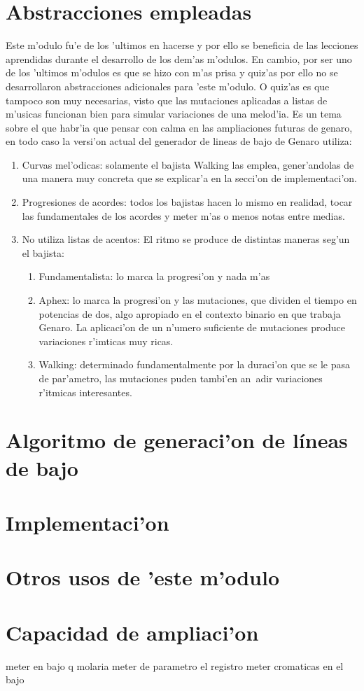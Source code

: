 \documentclass[a4paper,12pt]{article}
\begin{document}
\section{Abstracciones empleadas}
Este m'odulo fu'e de los 'ultimos en hacerse y por ello se beneficia de las lecciones aprendidas durante el desarrollo de los dem'as m'odulos. En cambio, por ser uno de los 'ultimos m'odulos es que se hizo con m'as prisa y quiz'as por ello no se desarrollaron abstracciones adicionales para 'este m'odulo. O quiz'as es que tampoco son muy necesarias, visto que las mutaciones aplicadas a listas de m'usicas funcionan bien para simular variaciones de una melod'ia. Es un tema sobre el que habr'ia que pensar con calma en las ampliaciones futuras de genaro, en todo caso la versi'on actual del generador de lineas de bajo de Genaro utiliza:
        \begin{enumerate}
        \item Curvas mel'odicas: solamente el bajista Walking las emplea, gener'andolas de una manera muy concreta que se explicar'a en la secci'on de implementaci'on.
        \item Progresiones de acordes: todos los bajistas hacen lo mismo en realidad, tocar las fundamentales de los acordes y meter m'as o menos notas entre medias.
        \item No utiliza listas de acentos: El ritmo se produce de distintas maneras seg'un el bajista:
                \begin{enumerate}
                \item Fundamentalista: lo marca la progresi'on y nada m'as
                \item Aphex: lo marca la progresi'on y las mutaciones, que dividen el tiempo en potencias de dos, algo apropiado en el contexto binario en que trabaja Genaro. La aplicaci'on de un n'umero suficiente de mutaciones produce variaciones r'imticas muy ricas.
                \item Walking: determinado fundamentalmente por la duraci'on que se le pasa de par'ametro, las mutaciones puden tambi'en an~adir variaciones r'itmicas interesantes.
                \end{enumerate}
        \end{enumerate}

\section{Algoritmo de generaci'on de l\'ineas de bajo}



\section{Implementaci'on}

\section {Otros usos de 'este m'odulo}

\section {Capacidad de ampliaci'on}
meter en bajo q molaria meter de parametro el registro
meter cromaticas en el bajo
\end{document}
